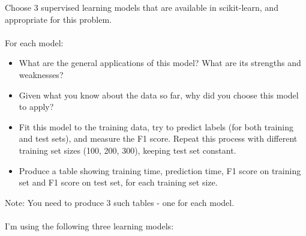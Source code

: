 \documentclass{article}
\begin{document}
Choose 3 supervised learning models that are available in scikit-learn, and appropriate for this problem. 
\\\\
For each model:
\begin{itemize}
\item What are the general applications of this model? What are its strengths and weaknesses?
\item Given what you know about the data so far, why did you choose this model to apply?
\item Fit this model to the training data, try to predict labels (for both training and test sets), and measure the F1 score. Repeat this process with different training set sizes (100, 200, 300), keeping test set constant.
\item Produce a table showing training time, prediction time, F1 score on training set and F1 score on test set, for each training set size.
\end{itemize}
Note: You need to produce 3 such tables - one for each model.
\\\\
\color{blue}
I'm using the following three learning models:
\\
\end{document}
